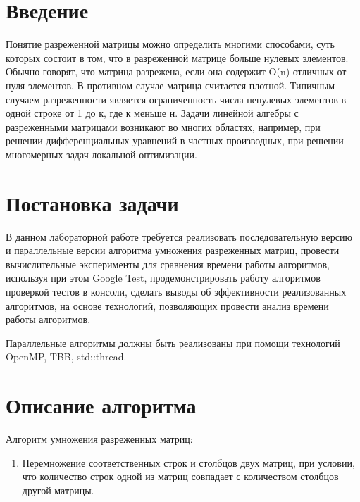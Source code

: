 \documentclass{report}
\begin{document}
\setcounter{page}{2}

\tableofcontents
\newpage

\section*{Введение}
\par Понятие разреженной матрицы можно определить многими способами, суть которых состоит в том, что в разреженной матрице больше нулевых элементов. Обычно говорят, что матрица разрежена, если она содержит  O(n) отличных от нуля элементов. В противном случае матрица считается плотной. Типичным случаем разреженности является ограниченность числа ненулевых элементов в одной строке от 1 до к, где к меньше н. Задачи линейной алгебры с разреженными матрицами возникают во многих областях, например, при решении дифференциальных уравнений в частных производных, при решении многомерных задач локальной оптимизации.
\newpage

\section*{Постановка задачи}
\par В данном лабораторной работе требуется реализовать последовательную версию и параллельные версии алгоритма умножения разреженных матриц, провести вычислительные эксперименты для сравнения времени работы алгоритмов, используя при этом Google Test, продемонстрировать работу алгоритмов проверкой тестов в консоли, сделать выводы об эффективности реализованных алгоритмов, на основе технологий, позволяющих провести анализ времени работы алгоритмов.
\par Параллельные алгоритмы должны быть реализованы при помощи технологий OpenMP, TBB, std::thread.
\newpage

\section*{Описание алгоритма}
\par Алгоритм умножения разреженных матриц:
\begin{enumerate}
\item Перемножение соответственных строк и столбцов двух матриц, при условии, что количество строк одной из матриц совпадает с количеством столбцов другой матрицы.
\end{enumerate}
\newpage
\end{document}
